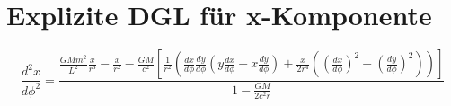 \section{Explizite DGL für x-Komponente}
\[
\frac{d^2x}{d\phi^2} = \frac{ \frac{GMm^2}{L^2}\frac{x}{r^3} - \frac{x}{r^2} - \frac{GM}{c^2}\left[ \frac{1}{r^2}\left(\frac{dx}{d\phi}\frac{dy}{d\phi}(y\frac{dx}{d\phi}-x\frac{dy}{d\phi}) + \frac{x}{2r^4}\left((\frac{dx}{d\phi})^2 + (\frac{dy}{d\phi})^2\right)\right) \right] }{ 1 - \frac{GM}{2c^2r} }
\]